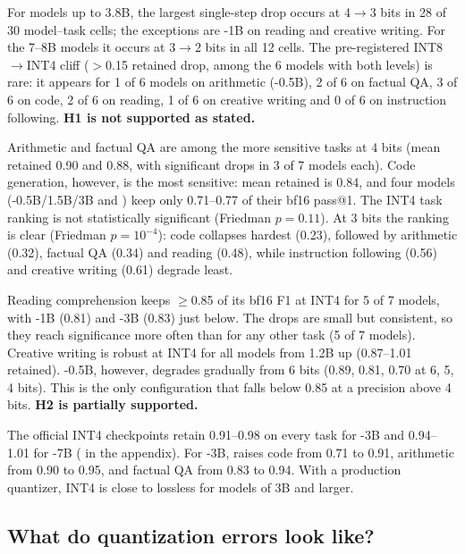  For models up to 3.8B, the largest single-step drop occurs at 4$\to$3 bits in 28 of 30 model--task cells; the exceptions are \llama-1B on reading and creative writing. For the 7--8B models it occurs at 3$\to$2 bits in all 12 cells. The pre-registered INT8$\to$INT4 cliff ($>$0.15 retained drop, among the 6 models with both levels) is rare: it appears for 1 of 6 models on arithmetic (\qwen-0.5B), 2 of 6 on factual QA, 3 of 6 on code, 2 of 6 on reading, 1 of 6 on creative writing and 0 of 6 on instruction following. \textbf{H1 is not supported as stated.}

 Arithmetic and factual QA are among the more sensitive tasks at 4 bits (mean retained 0.90 and 0.88, with significant drops in 3 of 7 models each). Code generation, however, is the most sensitive: mean retained is 0.84, and four models (\qwen-0.5B/1.5B/3B and \phithree) keep only 0.71--0.77 of their bf16 pass@1. The INT4 task ranking is not statistically significant (Friedman $p=0.11$). At 3 bits the ranking is clear (Friedman $p=10^{-4}$): code collapses hardest (0.23), followed by arithmetic (0.32), factual QA (0.34) and reading (0.48), while instruction following (0.56) and creative writing (0.61) degrade least.

 Reading comprehension keeps $\ge$0.85 of its bf16 F1 at INT4 for 5 of 7 models, with \llama-1B (0.81) and \qwen-3B (0.83) just below. The \squad drops are small but consistent, so they reach significance more often than for any other task (5 of 7 models). Creative writing is robust at INT4 for all models from 1.2B up (0.87--1.01 retained). \qwen-0.5B, however, degrades gradually from 6 bits (0.89, 0.81, 0.70 at 6, 5, 4 bits). This is the only configuration that falls below 0.85 at a precision above 4 bits. \textbf{H2 is partially supported.}

 The official \awq INT4 checkpoints retain 0.91--0.98 on every task for \qwen-3B and 0.94--1.01 for \qwen-7B ( in the appendix). For \qwen-3B, \awq raises code from 0.71 to 0.91, arithmetic from 0.90 to 0.95, and factual QA from 0.83 to 0.94. With a production quantizer, INT4 is close to lossless for models of 3B and larger.

\subsection{What do quantization errors look like?}
\label{sec:errors}

